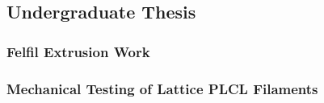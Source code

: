 \subsection{Undergraduate Thesis\label{sec:introduction:priorWork:undergradThesis}}

\subsubsection{Felfil Extrusion Work\label{sec:introduction:priorWork:undergradThesis:felfil}}

\subsubsection{Mechanical Testing of Lattice PLCL Filaments\label{sec:introduction:priorWork:undergradThesis:mechTesting}}
